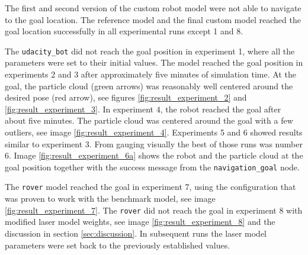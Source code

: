 \documentclass[10pt,journal,compsoc]{IEEEtran}
\begin{document}
The first and second version of the custom robot model were not able to navigate to the goal location. The reference model and the final custom model reached the goal location successfully in all experimental runs except 1 and 8.

The \texttt{udacity\_bot} did not reach the goal position in experiment 1, where all the parameters were set to their initial values. The model reached the goal position in experiments 2 and 3 after approximately five minutes of simulation time. At the goal, the particle cloud (green arrows) was reasonably well centered around the desired pose (red arrow), see figures \ref{fig:result_experiment_2} and \ref{fig:result_experiment_3}. In experiment  $4$, the robot reached the goal after about five minutes. The particle cloud was centered around the goal with a few outliers, see image \ref{fig:result_experiment_4}. Experiments 5 and 6 showed results similar to experiment 3. From gauging visually the best of those runs was number 6. Image \ref{fig:result_experiment_6a} shows the robot and the particle cloud at the goal position together with the success message from the \texttt{navigation\_goal} node.

The \texttt{rover} model reached the goal in experiment 7, using the configuration that was proven to work with the benchmark model, see image \ref{fig:result_experiment_7}. The \texttt{rover} did not reach the goal in experiment 8 with modified laser model weights, see image \ref{fig:result_experiment_8} and the discussion in section \ref{sec:discussion}. In subsequent runs the laser model parameters were set back to the previously established values.
\end{document}
